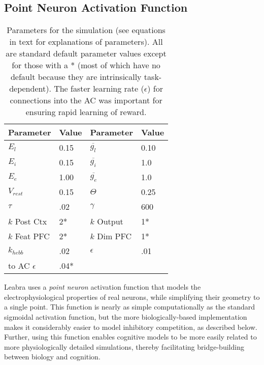 \subsection{Point Neuron Activation Function} 

\begin{table}
  \centering
  \begin{tabular}{ll|ll} \hline
Parameter & Value & Parameter & Value \\ \hline
$E_l$ & 0.15 & $\overline{g_l}$ & 0.10 \\
$E_i$ & 0.15 & $\overline{g_i}$ & 1.0 \\
$E_e$ & 1.00 & $\overline{g_e}$ & 1.0 \\
$V_{rest}$ & 0.15 & $\Theta$    & 0.25 \\
$\tau$ & .02 & $\gamma$ & 600 \\
$k$ Post Ctx & 2* & $k$ Output  & 1* \\
$k$ Feat PFC & 2* & $k$ Dim PFC & 1* \\
$k_{hebb}$ & .02 & $\epsilon$ & .01 \\
to AC $\epsilon$ & .04* & \\ \hline
  \end{tabular}
  \caption{\small Parameters for the simulation (see equations in text
    for explanations of parameters).  All are standard
    default parameter values except for those with a * (most of which
    have no default because they are intrinsically task-dependent).
    The faster learning rate ($\epsilon$) for connections into the AC
    was important for ensuring rapid learning of reward.}
  \label{tab.sim_params}
\end{table}

Leabra uses a {\em point neuron} activation function that models the electrophysiological properties of real neurons, while simplifying their geometry to a single point.  This function is nearly as simple computationally as the standard sigmoidal activation function, but the more biologically-based implementation makes it considerably easier to model inhibitory competition, as described below.  Further, using this function enables cognitive models to be more easily related to more physiologically detailed simulations, thereby facilitating bridge-building between biology and cognition.

